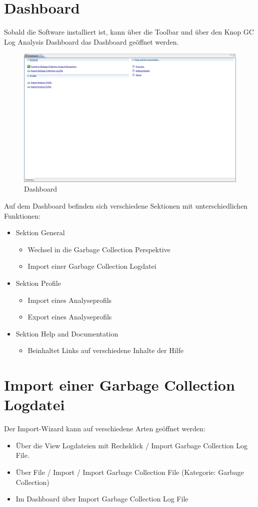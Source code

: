 \section{Dashboard}
Sobald die Software installiert ist, kann über die Toolbar und über den Knop GC Log Analysis Dashboard das Dashboard geöffnet werden. 
 \begin{figure}[H]
  	\centering
    	\includegraphics[width=16cm]{images/tutorial_dashboard}
        	\caption{Dashboard}
\end{figure}

Auf dem Dashboard befinden sich verschiedene Sektionen mit unterschiedlichen Funktionen:
\begin{itemize}
	\item Sektion General 
		\begin{itemize}
			\item Wechsel in die Garbage Collection Perspektive
			\item Import einer Garbage Collection Logdatei
		\end{itemize}
	\item Sektion Profile
		\begin{itemize}
			\item Import eines Analyseprofils
			\item Export eines Analyseprofils
		\end{itemize}
	\item Sektion Help and Documentation
		\begin{itemize}
			\item Beinhaltet Links auf verschiedene Inhalte der Hilfe
		\end{itemize}
\end{itemize}

\section{Import einer Garbage Collection Logdatei}
Der Import-Wizard kann auf verschiedene Arten geöffnet werden:
\begin{itemize}
	\item Über die View Logdateien mit Rechsklick / Import Garbage Collection Log File.
	\item Über File / Import / Import Garbage Collection File (Kategorie: Garbage Collection)
	\item Im Dashboard über Import Garbage Collection Log File
\end{itemize}

